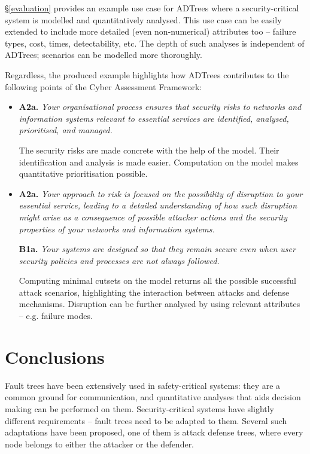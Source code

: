 \documentclass{scrreprt}
\begin{document}
\S\ref{evaluation} provides an example use case for ADTrees where a
security-critical system is modelled and quantitatively analysed. This use case
can be easily extended to include more detailed (even non-numerical) attributes
too -- failure types, cost, times, detectability, etc. The depth of such
analyses is  independent of ADTrees; scenarios can be modelled more thoroughly.

Regardless, the produced example highlights how ADTrees contributes to the
following points of the Cyber Assessment Framework:

\begin{itemize}
    \item 
        \textbf{A2a.} \textit{Your organisational process ensures that security
        risks to networks and information systems relevant to essential services
        are identified, analysed, prioritised, and managed.}

        The security risks are made concrete with the help of the model.  Their
        identification and analysis is made easier. Computation on the model
        makes quantitative prioritisation possible.

    \item
        \textbf{A2a.} \textit{Your approach to risk is focused on the
        possibility of disruption to your essential service, leading to a
        detailed understanding of how such disruption might arise as a
        consequence of possible attacker actions and the security properties of
        your networks and information systems.}

        \textbf{B1a.} \textit{Your systems are designed so that they remain
        secure even when user security policies and processes are not always
        followed.}

        Computing minimal cutsets on the model returns all the possible
        successful attack scenarios, highlighting the interaction between
        attacks and defense mechanisms. Disruption can be further analysed by
        using relevant attributes -- e.g. failure modes.
\end{itemize}

\chapter{Conclusions}
\label{conclusions}

Fault trees have been extensively used in safety-critical systems: they are a
common ground for communication, and quantitative analyses that aids decision
making can be performed on them. Security-critical systems have slightly
different requirements -- fault trees need to be adapted to them. Several such
adaptations have been proposed, one of them is attack defense trees, where every
node belongs to either the attacker or the defender.
\end{document}
